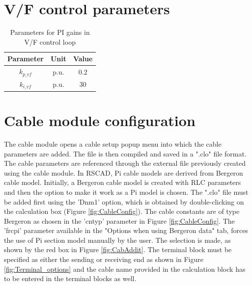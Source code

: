 \section{V/F control parameters}
\begin{table}[H]
\centering
\begin{tabular}{|c|c|c|}
\hline
\textbf{Parameter}  & \textbf{Unit}
& \textbf{Value} \\ \hline
$k_{p\_vf}$     & p.u. & 0.2 \\ \hline
$k_{i\_vf}$     & p.u. & 30 \\ \hline
\end{tabular}
\caption{Parameters for PI gains in V/F control loop \cite{vrana2013cigre}}
\label{tab:U_F_para}
\end{table}





\section{Cable module configuration}\label{config_cable}
The cable module opens a cable setup popup menu into which the cable parameters are added. The file is then compiled and saved in a ".clo" file format. The cable parameters are referenced through the external file previously created using the cable module. In RSCAD, Pi cable models are derived from Bergeron cable model. Initially, a Bergeron cable model is created with RLC parameters and then the option to make it work as a Pi model is chosen. The ".clo" file must be added first using the 'Dnm1' option, which is obtained by double-clicking on the calculation box (Figure \ref{fig:CableConfig}). The cable constants are of type Bergeron as chosen in the 'cntyp' parameter in Figure \ref{fig:CableConfig}. The 'frcpi' parameter available in the "Options when using Bergeron data" tab, forces the use of Pi section model manually by the user. The selection is made, as shown by the red box in Figure \ref{fig:CabAddit}. The terminal block must be specified as either the sending or receiving end as shown in Figure \ref{fig:Terminal_options} and the cable name provided in the calculation block has to be entered in the terminal blocks as well.\\

